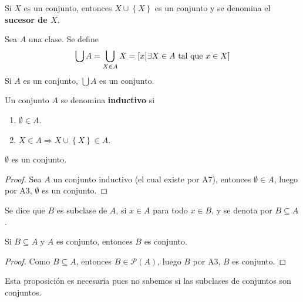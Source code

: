 \documentclass[12pt]{report}
\theoremstyle{largebreak}
\begin{document}
    \begin{exa}
        Si $X$ es un conjunto, entonces $X\cup\left\{X\right\}$ es un conjunto y se denomina el \textbf{sucesor de $X$}.
    \end{exa}

    \begin{mydef}
        Sea $A$ una clase. Se define
        \begin{equation*}
            \bigcup A=\bigcup_{X\in A}X=[x\big| \exists X\in A\textup{ tal que }x\in X]
        \end{equation*}
        Si $A$ es un conjunto, $\bigcup A$ es un conjunto.
    \end{mydef}

    \begin{mydef}
        Un conjunto $A$ se denomina \textbf{inductivo} si
        \renewcommand{\theenumi}{\roman{enumi}}
        \begin{enumerate}
            \item $\emptyset\in A$.
            \item $X\in A\Rightarrow X\cup\left\{X\right\}\in A$.
        \end{enumerate}
    \end{mydef}

    \begin{propo}
        $\emptyset$ es un conjunto.
    \end{propo}

    \begin{proof}
        Sea $A$ un conjunto inductivo (el cual existe por A7), entonces $\emptyset\in A$, luego por A3, $\emptyset$ es un conjunto.
    \end{proof}

    \begin{mydef}
        Se dice que $B$ es subclase de $A$, si $x\in A$ para todo $x\in B$, y se denota por $B\subseteq A$.
    \end{mydef}

    \begin{propo}
        Si $B\subseteq A$ y $A$ es conjunto, entonces $B$ es conjunto.
    \end{propo}

    \begin{proof}
        Como $B\subseteq A$, entonces $B\in\mathcal{P}(A)$, luego $B$ por A3, $B$ es conjunto.
    \end{proof}

    Esta proposición es necesaria pues no sabemos si las subclases de conjuntos son conjuntos.
\end{document}
